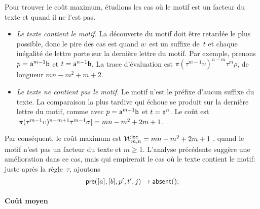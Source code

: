 Pour trouver le coût maximum, étudions les cas où le motif est un
facteur du texte et quand il ne l'est pas.
\begin{itemize}

\item \emph{Le texte contient le motif.} La découverte du motif doit
  être retardée le plus possible, donc le pire des cas est quand
  \(w\)~est un suffixe de~\(t\) et chaque inégalité de lettre porte
  sur la dernière lettre du motif. Par exemple, prenons \(p =
  \word{a}^{m-1}\word{b}\) et \(t = \word{a}^{n-1}\word{b}\). La trace
  d'évaluation est \(\pi (\tau^{m-1}\upsilon)^{n-m} \tau^m\rho\), de
  longueur \(mn-m^2+m+2\).

  \item \emph{Le texte ne contient pas le motif.} Le motif n'est le
  préfixe d'aucun suffixe du texte. La comparaison la plus tardive qui
  échoue se produit sur la dernière lettre du motif, comme avec \(p =
  \word{a}^{m-1}\word{b}\) et \(t = \word{a}^{n}\). Le coût est
  \(\len{\pi(\tau^{m-1}\upsilon)^{n-m+1}\tau^{m-1}\sigma} = mn - m^2 +
  2m + 1\).

\end{itemize}
Par conséquent, le coût maximum est \(\W{\fun{loc}}{m,n} = mn - m^2 +
2m + 1\) , quand le motif n'est pas un
facteur du texte et \(m \geqslant 1\). L'analyse précédente suggère
une amélioration dans ce cas, mais qui empirerait le cas où le texte
contient le motif: juste après la règle~\(\tau\), ajoutons
\begin{equation*}
\belowdisplayskip=0pt
\fun{pre}([a],[b],p',t',j) \rightarrow \fun{absent}();\index{pre@\fun{pre/5}}
\end{equation*}

\paragraph{Coût moyen}

